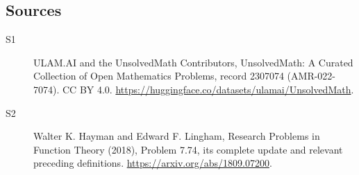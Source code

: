\documentclass[11pt]{article}
\begin{document}
\subsection{Sources}
\begin{description}
\item[\hypertarget{source:2307074:1}{S1}] ULAM.AI and the UnsolvedMath Contributors, UnsolvedMath: A Curated Collection of Open Mathematics Problems, record 2307074 (AMR-022-7074). CC BY 4.0. \url{https://huggingface.co/datasets/ulamai/UnsolvedMath}.
\item[\hypertarget{source:2307074:2}{S2}] Walter K. Hayman and Edward F. Lingham, Research Problems in Function Theory (2018), Problem 7.74, its complete update and relevant preceding definitions. \url{https://arxiv.org/abs/1809.07200}.
\end{description}
\label{end:2307074}
\end{document}
